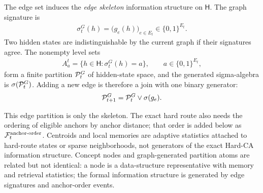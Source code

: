 \begin{definition}
\label{def:graph-signature-partition}
The edge set induces the \emph{edge skeleton} information structure on $\mathsf H$. The graph signature is
\begin{align*}
\sigma_t^G(h)=\big(g_e(h)\big)_{e\in E_t}\in\{0,1\}^{E_t}.
\end{align*}
Two hidden states are indistinguishable by the current graph if their signatures agree. The nonempty level sets
\begin{align*}
A_a^t=\{h\in\mathsf H:\sigma_t^G(h)=a\},\qquad a\in\{0,1\}^{E_t},
\end{align*}
form a finite partition $\mathcal{P}_t^G$ of hidden-state space, and the generated sigma-algebra is $\sigma(\mathcal{P}_t^G)$. Adding a new edge is therefore a join with one binary generator:
\begin{align*}
\mathcal{P}_{t+1}^G=\mathcal{P}_t^G\vee\sigma(g_e).
\end{align*}
\end{definition}

This edge partition is only the skeleton. The exact hard route also needs the ordering of eligible anchors by anchor distance; that order is added below as $\mathcal{F}_t^{\mathrm{anchor\text{-}order}}$. Centroids and local memories are adaptive statistics attached to hard-route states or sparse neighborhoods, not generators of the exact Hard-CA information structure. Concept nodes and graph-generated partition atoms are related but not identical: a node is a data-structure representative with memory and retrieval statistics; the formal information structure is generated by edge signatures and anchor-order events.

